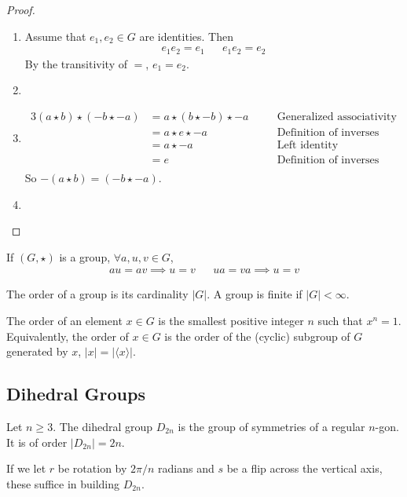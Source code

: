 \documentclass[a5paper]{article}
\begin{document}
\begin{proof}
  \begin{enumerate}%
    \item 
      Assume that $e_1,e_2\in G$ are identities. Then
      \begin{align*}
        e_1e_2 = e_1 && e_1e_2 = e_2
      \end{align*}
      By the transitivity of $=$, $e_1=e_2$.
    \item
    \item 
      \begin{alignat*}{3}
        (a\star b)\star (-b \star -a) &= a\star (b\star -b) \star -a
        &&\quad\text{Generalized associativity}\\
        &= a\star e \star -a &&\quad\text{Definition of inverses}\\
        &= a\star -a &&\quad\text{Left identity}\\
        &= e &&\quad\text{Definition of inverses}\\
      \end{alignat*}
      So $-(a\star b)=(-b \star -a)$.
    \item
  \end{enumerate}
\end{proof}

\begin{theorem}
  If $(G,\star)$ is a group, $\forall a,u,v\in G$,
	\begin{align*}
    au=av \implies u=v && ua=va \implies u=v
  \end{align*}
\end{theorem}

\begin{definition}
  The order of a group is its cardinality $|G|$. A group is finite if $|G|<\infty$.

	The order of an element $x\in G$ is the smallest positive integer $n$ such
  that $x^n=1$. Equivalently, the order of $x\in G$ is the order of the (cyclic)
  subgroup of $G$ generated by $x$, $|x|=|\langle x \rangle|$.
\end{definition}

\subsection{Dihedral Groups}
\begin{definition}
	Let $n\geq 3$. The dihedral group $D_{2n}$ is the group of symmetries of a
  regular $n$-gon. It is of order $|D_{2n}|=2n$.

  If we let $r$ be rotation by $2\pi/n$ radians and $s$ be a flip across the
  vertical axis, these suffice in building $D_{2n}$.
\end{definition}
\end{document}
